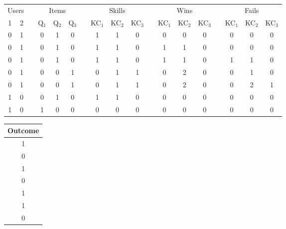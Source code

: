\documentclass{standalone}
\begin{document}
\begin{tabular}{cc c ccc c ccc c ccc c ccc }
\toprule
  \multicolumn{2}{c}{Users}  & & \multicolumn{3}{c}{Items} & & \multicolumn{3}{c}{Skills}  & & \multicolumn{3}{c}{Wins}  & &  \multicolumn{3}{c}{Fails}  \\
\cmidrule{1-2}
\cmidrule{4-6}
\cmidrule{8-10}
\cmidrule{12-14}
\cmidrule{16-18}
  1 & 2 & & Q$_1$ & Q$_2$ & Q$_3$ & & KC$_1$ & KC$_2$ & KC$_3$ & & KC$_1$ & KC$_2$ & KC$_3$ & & KC$_1$ & KC$_2$ & KC$_3$\\
\midrule
  0 &   1 & &  0 &   1 &   0 &&   1 &   1 &   0 &&   0 &   0 &   0 &&   0 &   0 &   0 \\
  0 &   1 & &  0 &   1 &   0 &&   1 &   1 &   0 &&   1 &   1 &   0 &&   0 &   0 &   0 \\
  0 &   1 & &  0 &   1 &   0 &&   1 &   1 &   0 &&   1 &   1 &   0 &&   1 &   1 &   0 \\
  0 &   1 & &  0 &   0 &   1 &&   0 &   1 &   1 &&   0 &   2 &   0 &&   0 &   1 &   0 \\
  0 &   1 & &  0 &   0 &   1 &&   0 &   1 &   1 &&   0 &   2 &   0 &&   0 &   2 &   1 \\
  1 &   0 & &  0 &   1 &   0 &&   1 &   1 &   0 &&   0 &   0 &   0 &&   0 &   0 &   0 \\
  1 &   0 & &  1 &   0 &   0 &&   0 &   0 &   0 &&   0 &   0 &   0 &&   0 &   0 &   0 \\
\bottomrule
\end{tabular}
\hspace{1mm}
\begin{tabular}{c}
\toprule
\multirow{2}[3]{*}{Outcome} \\[6mm]
\midrule
  1\\0\\1\\0\\1\\1\\0\\
\bottomrule
\end{tabular}\\
\end{document}
